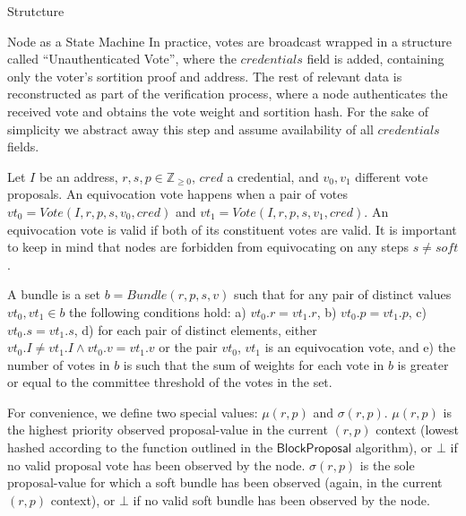 \documentclass[10pt,a4paper]{article}
\begin{document}
\begin{section}{Strutcture}
\begin{subsection}{Node as a State Machine}
In practice, votes are broadcast wrapped in a structure called ``Unauthenticated Vote'', 
where the $credentials$ field is added, containing only the voter's sortition proof and 
address.
The rest of relevant data is reconstructed as part of the verification process, 
where a node authenticates the received vote and obtains the vote weight and sortition hash.
For the sake of simplicity we abstract away this step and assume availability of all 
$credentials$ fields.


Let $I$ be an address, $r, s, p\in\mathbb{Z}_{\ge 0}$, $cred$ a credential, and $v_0,v_1$ different
vote proposals.
An {\sf equivocation vote} happens when a pair of votes
$vt_0 = Vote(I, r, p, s, v_0, cred)$ and $vt_1 = Vote(I, r, p, s, v_1, cred)$.
An equivocation vote is valid if both of its constituent votes are valid.
It is important to keep in mind that nodes are forbidden from equivocating 
on any steps $s \neq soft$.

A {\sf bundle} is a set $b = Bundle(r,p,s,v)$ such that for any pair of distinct values 
$vt_0, vt_1 \in b$ the following conditions hold: 
a) $vt_0.r = vt_1.r $, 
b) $vt_0.p = vt_1.p$,
c) $vt_0.s = vt_1.s$,
d) for each pair of distinct elements, either $vt_0.I \neq vt_1.I \land vt_0.v = vt_1.v$ or the pair $vt_0$, $vt_1$ 
is an equivocation vote, and
e) the number of votes in $b$ is such that the sum of weights for each vote in $b$ is greater or equal to the
committee threshold of the votes in the set.

For convenience, we define two special values: $\mu(r,p)$ and $\sigma(r,p)$.
$\mu(r,p)$ is the highest priority observed proposal-value in the current $(r,p)$ context 
(lowest hashed according to the function outlined in the $\mathsf{BlockProposal}$ algorithm), 
or $\bot$ if no valid proposal vote has been observed by the node.
$\sigma(r,p)$ is the sole proposal-value for which a soft bundle has been observed (again, 
in the current $(r,p)$ context), or $\bot$ if no valid soft bundle has been observed by the 
node.
\end{subsection}

\end{section}
\end{document}
